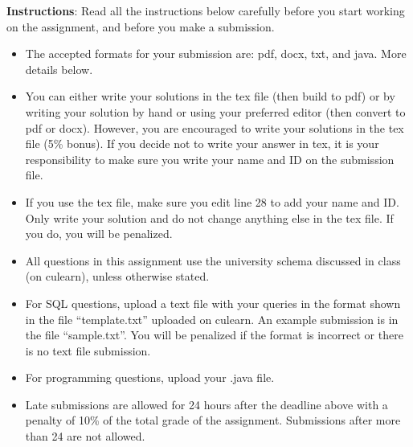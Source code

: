 \documentclass[a4 paper]{article}
\begin{document}
\textbf{Instructions}: Read all the instructions below carefully before you start working on the assignment, and before you make a submission.
\begin{itemize}
    \item The accepted formats for your submission are: pdf, docx, txt, and java. More details below. 
    \item You can either write your solutions in the tex file (then build to pdf) or by writing your solution by hand or using your preferred editor (then convert to pdf or docx). However, you are encouraged to write your solutions in the tex file (5\% bonus). If you decide not to write your answer in tex, it is your responsibility to make sure you write your name and ID on the submission file.
    \item If you use the tex file, make sure you edit line 28 to add your name and ID. Only write your solution and do not change anything else in the tex file. If you do, you will be penalized.
    \item All questions in this assignment use the university schema discussed in class (on culearn), unless otherwise stated.
    \item For SQL questions, upload a text file with your queries in the format shown in the file ``template.txt'' uploaded on culearn. An example submission is in the file ``sample.txt''. You will be penalized if the format is incorrect or there is no text file submission.
    \item For programming questions, upload your .java file.
    \item Late submissions are allowed for 24 hours after the deadline above with a penalty of 10\% of the total grade of the assignment. Submissions after more than 24 are not allowed.
\end{itemize}
\end{document}
